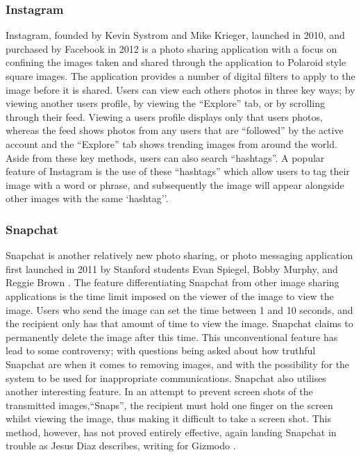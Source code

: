 \documentclass[a4paper]{article}
\begin{document}
\subsubsection{Instagram}
Instagram, founded by Kevin Systrom and Mike Krieger, launched in 2010, and purchased by Facebook in 2012 \cite{instagramWiki} is a photo sharing application with a focus on confining the images taken and shared through the application to Polaroid style square images. The application provides a number of digital filters to apply to the image before it is shared. Users can view each others photos in three key ways; by viewing another users profile, by viewing the ``Explore'' tab, or by scrolling through their feed. Viewing a users profile displays only that users photos, whereas the feed shows photos from any users that are ``followed'' by the active account and the ``Explore'' tab shows trending images from around the world. Aside from these key methods, users can also search ``hashtags''. A popular feature of Instagram is the use of these ``hashtags'' which allow users to tag their image with a word or phrase, and subsequently the image will appear alongside other images with the same `hashtag''.

\subsubsection{Snapchat}
Snapchat is another relatively new photo sharing, or photo messaging application first launched in 2011 by Stanford students Evan Spiegel, Bobby Murphy, and Reggie Brown \cite{snapchatWiki}. The feature differentiating Snapchat from other image sharing applications is the time limit imposed on the viewer of the image to view the image. Users who send the image can set the time between 1 and 10 seconds, and the recipient only has that amount of time to view the image. Snapchat claims to permanently delete the image after this time. This unconventional feature has lead to some controversy; with questions being asked about how truthful Snapchat are when it comes to removing images, and with the possibility for the system to be used for inappropriate communications. Snapchat also utilises another interesting feature. In an attempt to prevent screen shots of the transmitted images,``Snaps'', the recipient must hold one finger on the screen whilst viewing the image, thus making it difficult to take a screen shot. This method, however, has not proved entirely effective, again landing Snapchat in trouble as Jesus Diaz describes, writing for Gizmodo \cite{snapchatScreen}.
\end{document}
